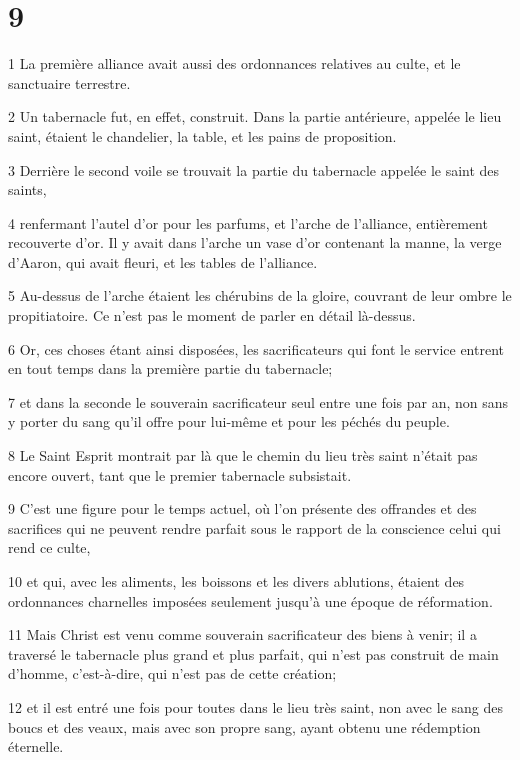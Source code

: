 \chapter{9}

\par 1 La première alliance avait aussi des ordonnances relatives au culte, et le sanctuaire terrestre.
\par 2 Un tabernacle fut, en effet, construit. Dans la partie antérieure, appelée le lieu saint, étaient le chandelier, la table, et les pains de proposition.
\par 3 Derrière le second voile se trouvait la partie du tabernacle appelée le saint des saints,
\par 4 renfermant l'autel d'or pour les parfums, et l'arche de l'alliance, entièrement recouverte d'or. Il y avait dans l'arche un vase d'or contenant la manne, la verge d'Aaron, qui avait fleuri, et les tables de l'alliance.
\par 5 Au-dessus de l'arche étaient les chérubins de la gloire, couvrant de leur ombre le propitiatoire. Ce n'est pas le moment de parler en détail là-dessus.
\par 6 Or, ces choses étant ainsi disposées, les sacrificateurs qui font le service entrent en tout temps dans la première partie du tabernacle;
\par 7 et dans la seconde le souverain sacrificateur seul entre une fois par an, non sans y porter du sang qu'il offre pour lui-même et pour les péchés du peuple.
\par 8 Le Saint Esprit montrait par là que le chemin du lieu très saint n'était pas encore ouvert, tant que le premier tabernacle subsistait.
\par 9 C'est une figure pour le temps actuel, où l'on présente des offrandes et des sacrifices qui ne peuvent rendre parfait sous le rapport de la conscience celui qui rend ce culte,
\par 10 et qui, avec les aliments, les boissons et les divers ablutions, étaient des ordonnances charnelles imposées seulement jusqu'à une époque de réformation.
\par 11 Mais Christ est venu comme souverain sacrificateur des biens à venir; il a traversé le tabernacle plus grand et plus parfait, qui n'est pas construit de main d'homme, c'est-à-dire, qui n'est pas de cette création;
\par 12 et il est entré une fois pour toutes dans le lieu très saint, non avec le sang des boucs et des veaux, mais avec son propre sang, ayant obtenu une rédemption éternelle.
